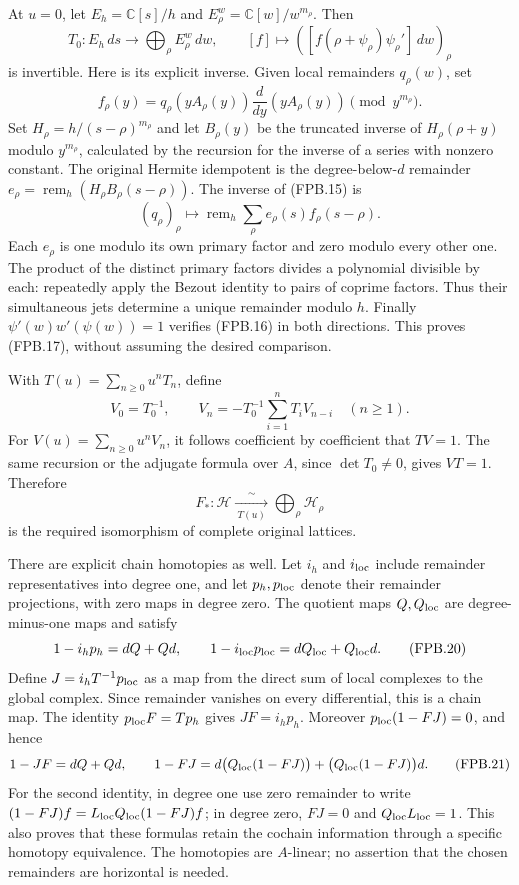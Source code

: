 At \(u=0\), let \(E_h=\mathbb C[s]/h\) and
\(E_\rho^w=\mathbb C[w]/w^{m_\rho}\). Then
\[
 T_0:E_h\,ds\longrightarrow\bigoplus_\rho E_\rho^w\,dw,
 \qquad [f]\longmapsto
   ([f(\rho+\psi_\rho)\psi_\rho']\,dw)_\rho
 \tag{FPB.15}\label{eq:fpb-T0}
\]
is invertible. Here is its explicit inverse. Given local remainders
\(q_\rho(w)\), set
\[
 f_\rho(y)=q_\rho(yA_\rho(y))
       \frac{d}{dy}(yA_\rho(y))\pmod {y^{m_\rho}}.
 \tag{FPB.16}\label{eq:fpb-inverse-jet}
\]
Set \(H_\rho=h/(s-\rho)^{m_\rho}\) and let \(B_\rho(y)\) be the
truncated inverse of \(H_\rho(\rho+y)\) modulo \(y^{m_\rho}\),
calculated by the recursion for the inverse of a series with nonzero
constant. The original Hermite idempotent is the degree-below-\(d\)
remainder
\(e_\rho=\operatorname{rem}_h(H_\rho B_\rho(s-\rho))\).
The inverse of (FPB.15) is
\[
 (q_\rho)_\rho\longmapsto
  \operatorname{rem}_h\sum_\rho e_\rho(s)f_\rho(s-\rho).
 \tag{FPB.17}\label{eq:fpb-CRT}
\]
Each \(e_\rho\) is one modulo its own primary factor and zero
modulo every other one. The product of the distinct primary factors
divides a polynomial divisible by each: repeatedly apply the Bezout
identity to pairs of coprime factors. Thus their simultaneous jets
determine a unique remainder modulo \(h\). Finally
\(\psi'(w)w'(\psi(w))=1\) verifies (FPB.16) in both directions.
This proves (FPB.17), without assuming the desired comparison.

With \(T(u)=\sum_{n\ge0}u^nT_n\), define
\[
 V_0=T_0^{-1},\qquad
 V_n=-T_0^{-1}\sum_{i=1}^n T_iV_{n-i}\quad(n\ge1).
 \tag{FPB.18}\label{eq:fpb-Tinverse}
\]
For \(V(u)=\sum_{n\ge0}u^nV_n\), it follows coefficient by
coefficient that \(TV=1\). The same
recursion or the adjugate formula over \(A\), since \(\det T_0\ne0\),
gives \(VT=1\). Therefore
\[
 F_*: \mathcal H\xrightarrow[\ T(u)\ ]{\ \sim\ }
       \bigoplus_\rho\mathcal H_\rho
 \tag{FPB.19}\label{eq:fpb-isomorphism}
\]
is the required isomorphism of complete original lattices.

There are explicit chain homotopies as well. Let \(i_h\) and
\(i_{\rm loc}\) include remainder representatives into degree one,
and let \(p_h,p_{\rm loc}\) denote their remainder projections,
with zero maps in degree zero. The quotient maps \(Q,Q_{\rm loc}\)
are degree-minus-one maps and satisfy
\[
 1-i_hp_h=dQ+Qd,\qquad
 1-i_{\rm loc}p_{\rm loc}=dQ_{\rm loc}+Q_{\rm loc}d.
 \tag{FPB.20}\label{eq:fpb-contractions}
\]
Define \(J=i_hT^{-1}p_{\rm loc}\) as a map from the direct sum of
local complexes to the global complex. Since remainder vanishes on
every differential, this is a chain map. The identity
\(p_{\rm loc}F=Tp_h\) gives \(JF=i_hp_h\). Moreover
\(p_{\rm loc}(1-FJ)=0\), and hence
\[
 1-JF=dQ+Qd,
 \qquad
 1-FJ=d\bigl(Q_{\rm loc}(1-FJ)\bigr)
          +\bigl(Q_{\rm loc}(1-FJ)\bigr)d.
 \tag{FPB.21}\label{eq:fpb-homotopy}
\]
For the second identity, in degree one use zero remainder to write
\((1-FJ)f=L_{\rm loc}Q_{\rm loc}(1-FJ)f\); in degree zero,
\(FJ=0\) and \(Q_{\rm loc}L_{\rm loc}=1\). This also proves that
these formulas retain the cochain information through a specific
homotopy equivalence. The homotopies are \(A\)-linear; no assertion
that the chosen remainders are horizontal is needed.

